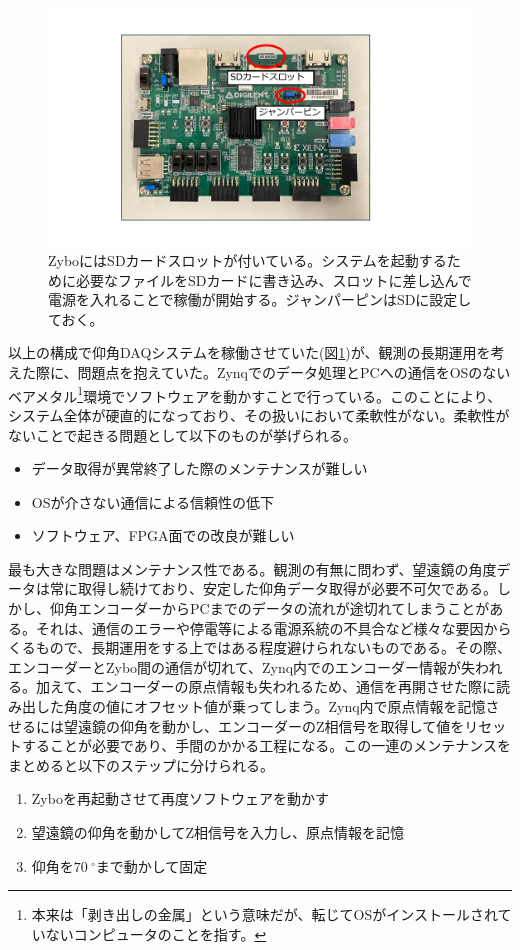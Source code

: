 \begin{figure}[htbp]
  \centering
  \includegraphics[width=0.6\columnwidth]{4_elDAQ/figs/sd_zybo2.pdf}
  \caption{ZyboにはSDカードスロットが付いている。システムを起動するために必要なファイルをSDカードに書き込み、スロットに差し込んで電源を入れることで稼働が開始する。ジャンパーピンはSDに設定しておく。}
  \label{sd_zybo}
\end{figure}

以上の構成で仰角DAQシステムを稼働させていた(図\ref{sd_zybo})が、観測の長期運用を考えた際に、問題点を抱えていた。Zynqでのデータ処理とPCへの通信をOSのないベアメタル\footnote{本来は「剥き出しの金属」という意味だが、転じてOSがインストールされていないコンピュータのことを指す。}環境でソフトウェアを動かすことで行っている。このことにより、システム全体が硬直的になっており、その扱いにおいて柔軟性がない。柔軟性がないことで起きる問題として以下のものが挙げられる。
\begin{itemize}
  \item データ取得が異常終了した際のメンテナンスが難しい
  \item OSが介さない通信による信頼性の低下
  \item ソフトウェア、FPGA面での改良が難しい
\end{itemize}

最も大きな問題はメンテナンス性である。観測の有無に問わず、望遠鏡の角度データは常に取得し続けており、安定した仰角データ取得が必要不可欠である。しかし、仰角エンコーダーからPCまでのデータの流れが途切れてしまうことがある。それは、通信のエラーや停電等による電源系統の不具合など様々な要因からくるもので、長期運用をする上ではある程度避けられないものである。その際、エンコーダーとZybo間の通信が切れて、Zynq内でのエンコーダー情報が失われる。加えて、エンコーダーの原点情報も失われるため、通信を再開させた際に読み出した角度の値にオフセット値が乗ってしまう。Zynq内で原点情報を記憶させるには望遠鏡の仰角を動かし、エンコーダーのZ相信号を取得して値をリセットすることが必要であり、手間のかかる工程になる。この一連のメンテナンスをまとめると以下のステップに分けられる。
\begin{enumerate}
  \item Zyboを再起動させて再度ソフトウェアを動かす
  \item 望遠鏡の仰角を動かしてZ相信号を入力し、原点情報を記憶
  \item 仰角を$\SI{70}{^{\circ}}$まで動かして固定
\end{enumerate}


